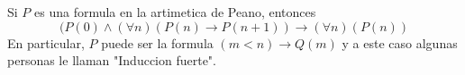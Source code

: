 \documentclass{book}
\newcounter{midefi}[chapter] %
\begin{document}
	\begin{midefinicion}
		Si $P$ es una formula en la artimetica de Peano, entonces
		$$(P(0) \land (\forall n)(P(n) \to P(n+1)) \to (\forall n)(P(n))$$
		En particular, $P$ puede ser la formula $(m < n)\to Q(m)$ y a este
		caso
		algunas personas le llaman "Induccion fuerte".
	\end{midefinicion}
\end{document}
